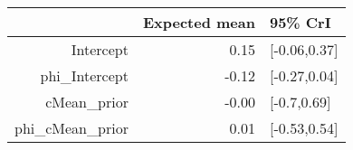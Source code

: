 \begin{tabular}{rrl}
  \hline
 & Expected mean & 95\% CrI \\ 
  \hline
Intercept & 0.15 & [-0.06,0.37] \\ 
  phi\_Intercept & -0.12 & [-0.27,0.04] \\ 
  cMean\_prior & -0.00 & [-0.7,0.69] \\ 
  phi\_cMean\_prior & 0.01 & [-0.53,0.54] \\ 
   \hline
\end{tabular}

